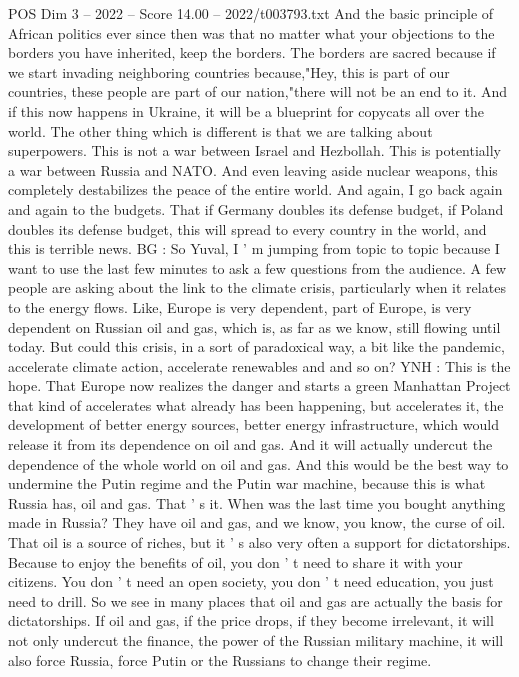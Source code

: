 \begin{textsample}{POS Dim 3 – 2022 – Score 14.00 – 2022/t003793.txt}
And the basic principle of African politics ever since then was that no matter what your objections to the borders you have inherited, keep the borders.
The borders are sacred because if we start invading neighboring countries because,"Hey, this is part of our countries, these people are part of our nation,"there will not be an end to it.
And if this now happens in Ukraine, it will be a blueprint for copycats all over the world.
The other thing which is different is that we are talking about superpowers.
This is not a war between Israel and Hezbollah.
This is potentially a war between Russia and NATO.
And even leaving aside nuclear weapons, this completely destabilizes the peace of the entire world.
And again, I go back again and again to the budgets.
That if Germany doubles its defense budget, if Poland doubles its defense budget, this will spread to every country in the world, and this is terrible news.
BG : So Yuval, I ' m jumping from topic to topic because I want to use the last few minutes to ask a few questions from the audience.
A few people are asking about the link to the climate crisis, particularly when it relates to the energy flows.
Like, Europe is very dependent, part of Europe, is very dependent on Russian oil and gas, which is, as far as we know, still flowing until today.
But could this crisis, in a sort of paradoxical way, a bit like the pandemic, accelerate climate action, accelerate renewables and and so on?
YNH : This is the hope.
That Europe now realizes the danger and starts a green Manhattan Project that kind of accelerates what already has been happening, but accelerates it, the development of better energy sources, better energy infrastructure, which would release it from its dependence on oil and gas.
And it will actually undercut the dependence of the whole world on oil and gas.
And this would be the best way to undermine the Putin regime and the Putin war machine, because this is what Russia has, oil and gas.
That ' s it.
When was the last time you bought anything made in Russia?
They have oil and gas, and we know, you know, the curse of oil.
That oil is a source of riches, but it ' s also very often a support for dictatorships.
Because to enjoy the benefits of oil, you don ' t need to share it with your citizens.
You don ' t need an open society, you don ' t need education, you just need to drill.
So we see in many places that oil and gas are actually the basis for dictatorships.
If oil and gas, if the price drops, if they become irrelevant, it will not only undercut the finance, the power of the Russian military machine, it will also force Russia, force Putin or the Russians to change their regime.

\end{textsample}
